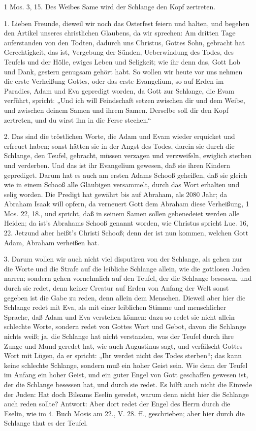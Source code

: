 1 Mos. 3, 15. Des Weibes Same wird der Schlange den Kopf zertreten.

1. Lieben Freunde, dieweil wir noch das Osterfest feiern und halten, und begehen den Artikel unseres christlichen Glaubens, da wir sprechen: Am dritten Tage auferstanden von den Todten, dadurch uns Christus, Gottes Sohn, gebracht hat Gerechtigkeit, das ist, Vergebung der Sünden, Ueberwindung des Todes, des Teufels und der Hölle, ewiges Leben und Seligkeit; wie ihr denn das, Gott Lob und Dank, gestern genugsam gehört habt. So wollen wir heute vor uns nehmen die erste Verheißung Gottes, oder das erste Evangelium, so auf Erden im Paradies, Adam und Eva gepredigt worden, da Gott zur Schlange, die Evam verführt, spricht: „Und ich will Feindschaft setzen zwischen dir und dem Weibe, und zwischen deinem Samen und ihrem Samen. Derselbe soll dir den Kopf zertreten, und du wirst ihn in die Ferse stechen.“

2. Das sind die tröstlichen Worte, die Adam und Evam wieder erquicket und erfreuet haben; sonst hätten sie in der Angst des Todes, darein sie durch die Schlange, den Teufel, gebracht, müssen verzagen und verzweifeln, ewiglich sterben und verderben. Und das ist ihr Evangelium gewesen, daß sie ihren Kindern geprediget. Darum hat es auch am ersten Adams Schooß geheißen, daß sie gleich wie in einem Schooß alle Gläubigen versammelt, durch das Wort erhalten und selig worden. Die Predigt hat gewährt bis auf Abraham, als 2080 Jahr; da Abraham Isaak will opfern, da verneuert Gott dem Abraham diese Verheißung, 1 Mos. 22, 18., und spricht, daß in seinem Samen sollen gebenedeiet werden alle Heiden; da ist's Abrahams Schooß genannt worden, wie Christus spricht Luc. 16, 22. Jetzund aber heißt’s Christi Schooß; denn der ist nun kommen, welchen Gott Adam, Abraham verheißen hat.

3. Darum wollen wir auch nicht viel disputiren von der Schlange, als gehen nur die Worte und die Strafe auf die leibliche Schlange allein, wie die gottlosen Juden narren; sondern gehen vornehmlich auf den Teufel, der die Schlange besessen, und durch sie redet, denn keiner Creatur auf Erden von Anfang der Welt sonst gegeben ist die Gabe zu reden, denn allein dem Menschen. Dieweil aber hier die Schlange redet mit Eva, als mit einer leiblichen Stimme und menschlicher Sprache, daß Adam und Eva verstehen können: dazu so redet sie nicht allein schlechte Worte, sondern redet von Gottes Wort
und Gebot, davon die Schlange nichts weiß; ja, die Schlange hat nicht verstanden, was der Teufel durch ihre Zunge und Mund geredet hat, wie auch Augustinus sagt, und verfälscht Gottes Wort mit Lügen, da er spricht: „Ihr werdet nicht des Todes sterben“; das kann keine schlechte Schlange, sondern muß ein hoher Geist sein. Wie denn der Teufel im Anfang ein hoher Geist, und ein guter Engel von Gott geschaffen gewesen ist, der die Schlange besessen hat, und durch sie redet. Es hilft auch nicht die Einrede der Juden: Hat doch Bileams Eselin geredet, warum denn nicht hier die Schlange auch reden sollte? Antwort: Aber dort redet der Engel des Herrn durch die Eselin, wie im 4. Buch Mosis am 22., V. 28. ff., geschrieben; aber hier durch die Schlange thut es der Teufel.

